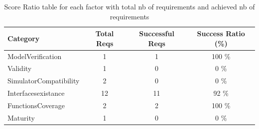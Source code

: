 \documentclass{article}
\begin{document}
						\begin{table}
						\centering
						\caption{Score Ratio table for each factor with total nb of requirements and achieved nb of requirements}
						\begin{tabular}{|l|c|c|c|}
						\hline
						Category & Total Reqs & Successful Reqs & Success Ratio (\%) \\
						\hline

							    ModelVerification & 1 & 1 & 100 \% \\
							 

							    Validity & 1 & 0 & 0 \% \\
							 

							    SimulatorCompatibility & 2 & 0 & 0 \% \\
							 

							    Interfacesexistance & 12 & 11 & 92 \% \\
							 

							    FunctionsCoverage & 2 & 2 & 100 \% \\
							 

							    Maturity & 1 & 0 & 0 \% \\
							 
					
						
						\hline
						\end{tabular}
						\end{table}




										
								

			
\end{document}
